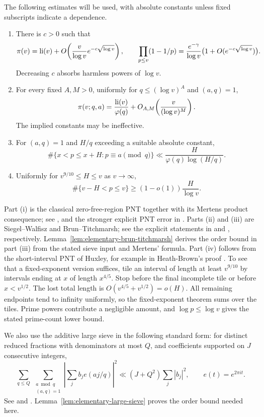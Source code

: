 \begin{lemma}\label{lem:prime-inputs}
The following estimates will be used, with absolute constants unless
fixed subscripts indicate a dependence.
\begin{enumerate}[label=\textup{(\roman*)}]
\item There is $c>0$ such that
\[
 \pi(v)=\operatorname{li}(v)+O\!\left(\frac v{\log v}e^{-c\sqrt{\log v}}\right),
 \qquad
 \prod_{p\le v}(1-1/p)
 =\frac{e^{-\gamma}}{\log v}
   \bigl(1+O(e^{-c\sqrt{\log v}})\bigr).
\]
Decreasing $c$ absorbs harmless powers of $\log v$.
\item For every fixed $A,M>0$, uniformly for
$q\le(\log v)^A$ and $(a,q)=1$,
\[
 \pi(v;q,a)=\frac{\operatorname{li}(v)}{\varphi(q)}
             +O_{A,M}\!\left(\frac v{(\log v)^M}\right).
\]
The implied constants may be ineffective.
\item For $(a,q)=1$ and $H/q$ exceeding a suitable absolute constant,
\[
 \#\{x<p\le x+H:p\equiv a\pmod q\}
 \ll\frac{H}{\varphi(q)\log(H/q)}.
\]
\item Uniformly for $v^{9/10}\le H\le v$ as $v\to\infty$,
\[
 \#\{v-H<p\le v\}\ge(1-o(1))\frac H{\log v}.
\]
\end{enumerate}
\end{lemma}

Part (i) is the classical zero-free-region PNT together with its Mertens
product consequence; see \cite{IwaniecKowalski2004}, and the stronger
explicit PNT error in \cite{FioriKadiriSwidinsky2023}.
Parts (ii) and (iii) are Siegel--Walfisz and Brun--Titchmarsh; see the
explicit statements in \cite[p.~75]{GranvilleSoundararajan} and
\cite[Theorem~1.4.4, p.~39]{GranvilleSoundararajan2014}, respectively.
Lemma~\ref{lem:elementary-brun-titchmarsh} derives the order bound in
part (iii) from the stated sieve input and Mertens' formula.
Part (iv) follows from the short-interval
PNT of Huxley, for example in Heath-Brown's proof
\cite[Theorem, p.~1365]{HeathBrown1982}.
To see that a fixed-exponent version suffices,
tile an interval of length at least $v^{9/10}$ by intervals ending at $x$
of length $x^{4/5}$. Stop before the final incomplete tile or before
$x<v^{1/2}$. The lost total length is
$O(v^{4/5}+v^{1/2})=o(H)$. All remaining endpoints tend to infinity
uniformly, so the fixed-exponent theorem sums over the tiles. Prime
powers contribute a negligible amount, and $\log p\le\log v$ gives the
stated prime-count lower bound.

We also use the additive large sieve in the following standard form:
for distinct reduced fractions with denominators at most $Q$, and
coefficients supported on $J$ consecutive integers,
\begin{equation}\label{eq:large-sieve-input}
 \sum_{q\le Q}\ \sum_{\substack{a\bmod q\\(a,q)=1}}
 \left|\sum_j b_j e(aj/q)\right|^2
 \ll(J+Q^2)\sum_j|b_j|^2,
 \qquad e(t)=e^{2\pi it}.
\end{equation}
See \cite{MontgomeryVaughan1973} and \cite[Theorem~3]{VaughanLargeSieve}.
Lemma~\ref{lem:elementary-large-sieve} proves the order bound needed here.

